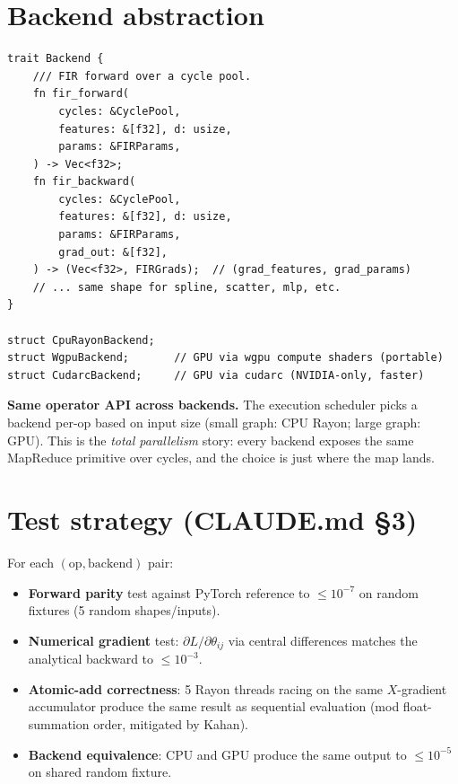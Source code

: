 \documentclass[10pt]{article}
\begin{document}
\section*{Backend abstraction}

\begin{lstlisting}
trait Backend {
    /// FIR forward over a cycle pool.
    fn fir_forward(
        cycles: &CyclePool,
        features: &[f32], d: usize,
        params: &FIRParams,
    ) -> Vec<f32>;
    fn fir_backward(
        cycles: &CyclePool,
        features: &[f32], d: usize,
        params: &FIRParams,
        grad_out: &[f32],
    ) -> (Vec<f32>, FIRGrads);  // (grad_features, grad_params)
    // ... same shape for spline, scatter, mlp, etc.
}

struct CpuRayonBackend;
struct WgpuBackend;       // GPU via wgpu compute shaders (portable)
struct CudarcBackend;     // GPU via cudarc (NVIDIA-only, faster)
\end{lstlisting}

\textbf{Same operator API across backends.} The execution scheduler
picks a backend per-op based on input size (small graph: CPU Rayon;
large graph: GPU). This is the \emph{total parallelism} story: every
backend exposes the same MapReduce primitive over cycles, and the
choice is just where the map lands.

\section*{Test strategy (CLAUDE.md \S3)}

For each $(\text{op}, \text{backend})$ pair:
\begin{itemize}
  \item \textbf{Forward parity} test against PyTorch reference to
    $\le 10^{-7}$ on random fixtures (5 random shapes/inputs).
  \item \textbf{Numerical gradient} test:
    $\partial L / \partial \theta_{ij}$ via central differences
    matches the analytical backward to $\le 10^{-3}$.
  \item \textbf{Atomic-add correctness}: 5 Rayon threads racing on
    the same $X$-gradient accumulator produce the same result as
    sequential evaluation (mod float-summation order, mitigated by
    Kahan).
  \item \textbf{Backend equivalence}: CPU and GPU produce the same
    output to $\le 10^{-5}$ on shared random fixture.
\end{itemize}
\end{document}
